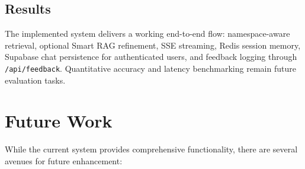 \documentclass[12pt,a4paper]{book}
\numberwithin{table}{chapter}
\numberwithin{figure}{chapter}
\numberwithin{equation}{chapter}
\begin{document}
\subsection{Results}

The implemented system delivers a working end-to-end flow: namespace-aware retrieval, optional Smart RAG refinement, SSE streaming, Redis session memory, Supabase chat persistence for authenticated users, and feedback logging through \texttt{/api/feedback}. Quantitative accuracy and latency benchmarking remain future evaluation tasks.

\section{Future Work}

While the current system provides comprehensive functionality, there are several avenues for future enhancement:
\end{document}
